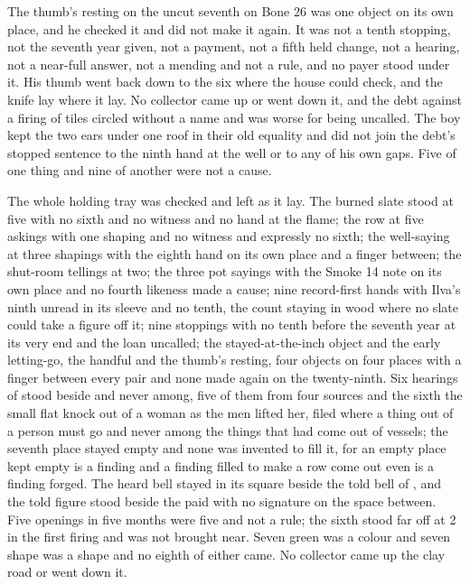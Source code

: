 The thumb's resting on the uncut seventh on Bone 26 was one object on its own place, and he checked it and did not make it again. It was not a tenth stopping, not the seventh year given, not a payment, not a fifth held change, not a hearing, not a near-full answer, not a mending and not a rule, and no payer stood under it. His thumb went back down to the six where the house could check, and the knife lay where it lay. No collector came up  or went down it, and the debt against a firing of tiles circled without a name and was worse for being uncalled. The boy kept the two ears under one roof in their old equality and did not join the debt's stopped sentence to the ninth hand at the well or to any of his own gaps. Five of one thing and nine of another were not a cause.

\scenebreak

The whole holding tray was checked and left as it lay. The burned slate stood at five with no sixth and no witness and no hand at the flame; the row at five askings with one shaping and no witness and expressly no sixth; the well-saying at three shapings with the eighth hand on its own place and a finger between; the shut-room tellings at two; the three pot sayings with the Smoke 14 note on its own place and no fourth likeness made a cause; nine record-first hands with Ilva's ninth unread in its sleeve and no tenth, the count staying in wood where no slate could take a figure off it; nine stoppings with no tenth before the seventh year at its very end and the loan uncalled; the stayed-at-the-inch object and the early letting-go, the handful and the thumb's resting, four objects on four places with a finger between every pair and none made again on the twenty-ninth. Six hearings of  stood beside and never among, five of them from four sources and the sixth the small flat knock out of a woman as the men lifted her, filed where a thing out of a person must go and never among the things that had come out of vessels; the seventh place stayed empty and none was invented to fill it, for an empty place kept empty is a finding and a finding filled to make a row come out even is a finding forged. The heard bell stayed in its square beside the told bell of , and the told figure stood beside the paid with no signature on the space between. Five openings in five months were five and not a rule; the sixth stood far off at  2 in the first firing and was not brought near. Seven green was a colour and seven shape was a shape and no eighth of either came. No collector came up the clay road or went down it.

